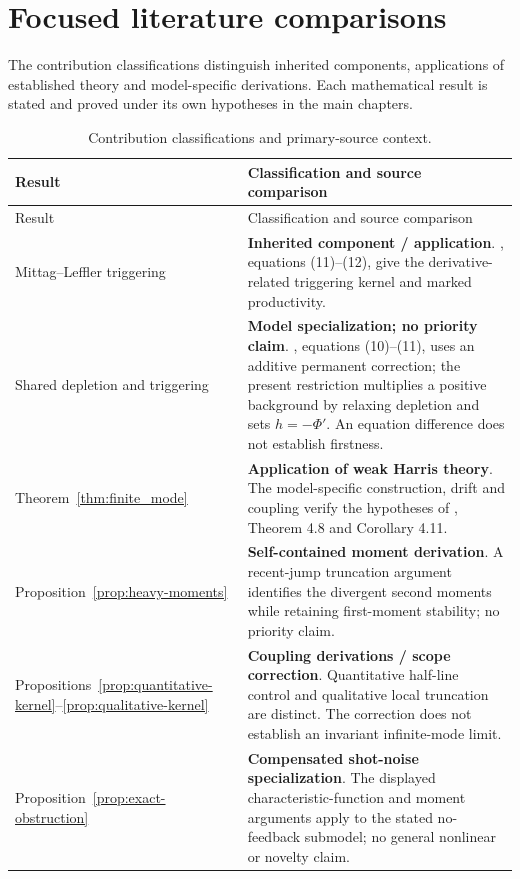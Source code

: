 \section{Focused literature comparisons}
\label{app:literature_status}

The contribution classifications distinguish inherited components, applications of established theory and model-specific derivations. Each mathematical result is stated and proved under its own hypotheses in the main chapters.

\begin{longtable}{@{}>{\raggedright\arraybackslash}p{}>{\raggedright\arraybackslash}p{}@{}}
\caption{Contribution classifications and primary-source context.}\label{tab:contribution-classification}\\
\toprule Result & Classification and source comparison \\ \midrule\endfirsthead
\toprule Result & Classification and source comparison \\ \midrule\endhead
Mittag--Leffler triggering & \textbf{Inherited component / application}. \citet{DavisBaeumerWang2024}, equations (11)--(12), give the derivative-related triggering kernel and marked productivity. \\
Shared depletion and triggering & \textbf{Model specialization; no priority claim}. \citet{PetrilloZhuangLippiello2023}, equations (10)--(11), uses an additive permanent correction; the present restriction multiplies a positive background by relaxing depletion and sets \(h=-\Phi'\). An equation difference does not establish firstness. \\
Theorem~\ref{thm:finite_mode} & \textbf{Application of weak Harris theory}. The model-specific construction, drift and coupling verify the hypotheses of \citet{HairerMattinglyScheutzow2011}, Theorem 4.8 and Corollary 4.11. \\
Proposition~\ref{prop:heavy-moments} & \textbf{Self-contained moment derivation}. A recent-jump truncation argument identifies the divergent second moments while retaining first-moment stability; no priority claim. \\
Propositions~\ref{prop:quantitative-kernel}--\ref{prop:qualitative-kernel} & \textbf{Coupling derivations / scope correction}. Quantitative half-line control and qualitative local truncation are distinct. The correction does not establish an invariant infinite-mode limit. \\
Proposition~\ref{prop:exact-obstruction} & \textbf{Compensated shot-noise specialization}. The displayed characteristic-function and moment arguments apply to the stated no-feedback submodel; no general nonlinear or novelty claim. \\

\end{longtable}
